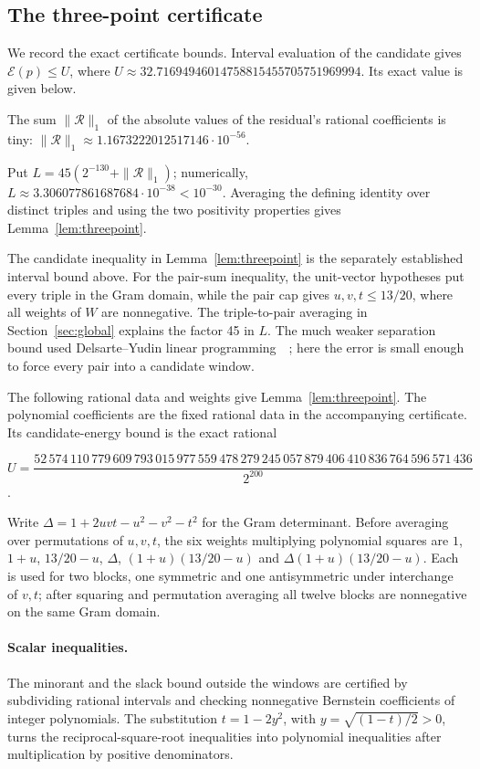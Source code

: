 \documentclass[11pt]{article}
\newcommand{\E}{\mathcal{E}}
\begin{document}
\begin{appendices}
\subsection{The three-point certificate}\label{app:certificates}
We record the exact certificate bounds.
Interval
evaluation of the candidate gives $\E(p)\leq U$, where\newline
$U\approx32.71694946014758815455705751969994$.
Its exact value is given below.

The sum $\|\mathcal R\|_1$ of the absolute values of the residual's
rational coefficients is tiny:
$\|\mathcal R\|_1\approx1.1673222012517146\cdot10^{-56}$.


Put $L=45(2^{-130}+\|\mathcal R\|_1)$; numerically,
$L\approx3.306077861687684\cdot10^{-38}<10^{-30}$.
Averaging the defining identity over distinct triples
and using the two positivity properties gives Lemma~\ref{lem:threepoint}.

The candidate inequality in Lemma~\ref{lem:threepoint} is the separately established
interval bound above. For the pair-sum inequality, the unit-vector
hypotheses put every triple in the Gram domain, while the pair cap gives
$u,v,t\leq13/20$, where all weights of $W$ are nonnegative.
The triple-to-pair averaging in Section~\ref{sec:global} explains the factor 45 in $L$. The much weaker separation bound used
Delsarte--Yudin linear programming~\cite[Section~1]{bachoc}~\cite[Section~1.1]{cohnwoo}; here the error is small enough to
force every pair into a candidate window.

The following rational data and weights give Lemma~\ref{lem:threepoint}.
The polynomial coefficients are the fixed rational data in the
accompanying certificate. Its candidate-energy bound is the exact rational
\begin{center}\small
$U=\dfrac{52\,574\,110\,779\,609\,793\,015\,977\,559\,478\,279\,245\,057\,879\,406\,410\,836\,764\,596\,571\,436}{2^{200}}$.
\end{center}
Write $\Delta=1+2uvt-u^2-v^2-t^2$ for the Gram determinant. Before
averaging over permutations of $u,v,t$, the six weights multiplying
polynomial squares are
$1$, $1+u$, $13/20-u$, $\Delta$, $(1+u)(13/20-u)$ and
$\Delta(1+u)(13/20-u)$. Each is used for two blocks, one symmetric and
one antisymmetric under interchange of $v,t$; after squaring and
permutation averaging all twelve blocks are nonnegative on the same
Gram domain.



\paragraph{Scalar inequalities.}
The minorant and the slack bound outside the windows are certified by
subdividing rational intervals and checking nonnegative Bernstein
coefficients of integer polynomials. The substitution
$t=1-2y^2$, with $y=\sqrt{(1-t)/2}>0$, turns the reciprocal-square-root
inequalities into polynomial inequalities after multiplication by positive
denominators.


\end{appendices}
\end{document}
